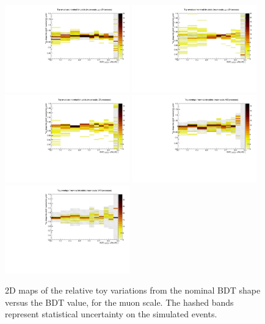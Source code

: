 \begin{figure}[htbp]
\begin{center}
\includegraphics[width=0.48\textwidth]{figures/syst_BDT_ZH_hinv_sm_toyenvelope_muon.pdf}
\includegraphics[width=0.48\textwidth]{figures/syst_BDT_ggZH_hinv_toyenvelope_muon.pdf}
\includegraphics[width=0.48\textwidth]{figures/syst_BDT_ZZ_toyenvelope_muon.pdf}
\includegraphics[width=0.48\textwidth]{figures/syst_BDT_WZ_toyenvelope_muon.pdf}
\includegraphics[width=0.48\textwidth]{figures/syst_BDT_VVV_toyenvelope_muon.pdf}
\caption{2D maps of the relative toy variations from the nominal BDT shape versus the BDT value, for the muon scale. The hashed bands represent statistical uncertainty on the simulated events.}
\label{fig:bdt_toy_envelopes_muon}
\end{center}
\end{figure}

